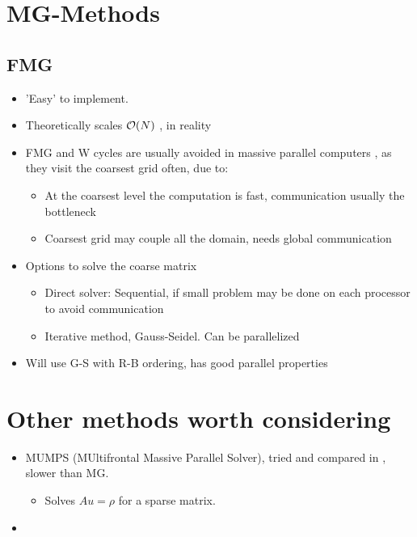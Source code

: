 


\section{MG-Methods}
	
	\subsection{FMG}
		\begin{itemize}
			\item 'Easy' to implement.
			\item Theoretically scales \(\order{N}\) \citep{Press1987}, in reality 
			\item FMG and W cycles are usually avoided in massive parallel computers \citep{Chow2006}, as they visit the coarsest grid often, due to:
				\begin{itemize}
					\item At the coarsest level the computation is fast, communication usually the bottleneck
					\item Coarsest grid may couple all the domain, needs global communication
				\end{itemize}
			\item Options to solve the coarse matrix \citep{Chow2006}
				\begin{itemize}
					\item Direct solver: Sequential, if small problem may be done on each processor to avoid communication
					\item Iterative method, Gauss-Seidel. Can be parallelized
				\end{itemize}
			\item Will use G-S with R-B ordering, has good parallel properties
		\end{itemize}


\section{Other methods worth considering}
		\begin{itemize}
			\item MUMPS (MUltifrontal Massive Parallel Solver), tried and compared in \cite{Kacem2012}, slower than MG.
				\begin{itemize}
					\item Solves \(Au = \rho\) for a sparse matrix.
				\end{itemize}
			\item 

		\end{itemize}














